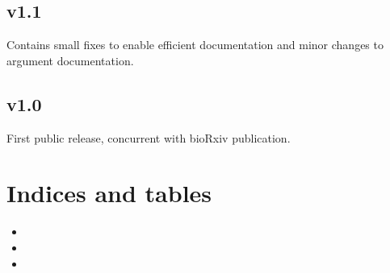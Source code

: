 \documentclass[letterpaper,12pt,english]{sphinxmanual}
\begin{document}
\section{v1.1}
\label{\detokenize{releases:v1-1}}
Contains small fixes to enable efficient documentation and minor changes to argument documentation.


\section{v1.0}
\label{\detokenize{releases:v1-0}}
First public release, concurrent with bioRxiv publication.


\chapter{Indices and tables}
\label{\detokenize{index:indices-and-tables}}\begin{itemize}
\item {} 

\item {} 

\item {} 

\end{itemize}



\renewcommand{\indexname}{Index}
\printindex
\end{document}
